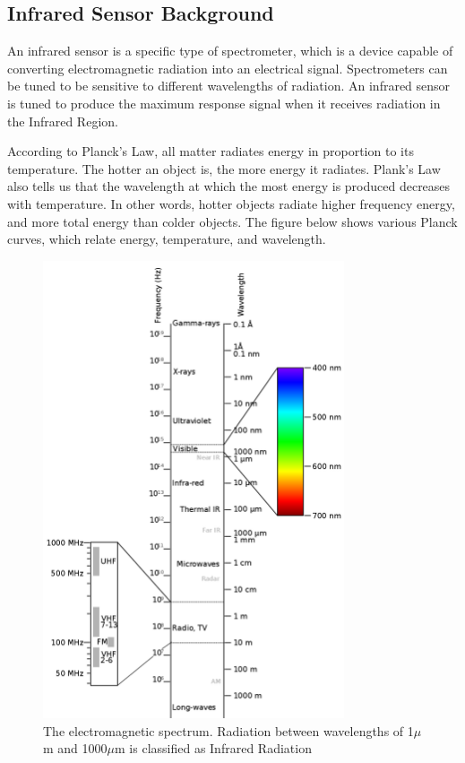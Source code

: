 \documentclass[12pt,journal,compsoc]{IEEEtran}
\begin{document}
\subsection{Infrared Sensor Background}
An infrared sensor is a specific type of spectrometer, which is a device capable of converting electromagnetic radiation into an electrical signal. Spectrometers can be tuned to be sensitive to different wavelengths of radiation. An infrared sensor is tuned to produce the maximum response signal when it receives radiation in the Infrared Region. 

According to Planck's Law, all matter radiates energy in proportion to its temperature. The hotter an object is, the more energy it radiates. Plank's Law also tells us that the wavelength at which the most energy is produced decreases with temperature. In other words, hotter objects radiate higher frequency energy, and more total energy than colder objects. The figure below shows various Planck curves, which relate energy, temperature, and wavelength.

\begin{figure}[h]
\centering
\includegraphics[width=3.5in]{em_spectrum.png}
\caption{The electromagnetic spectrum. Radiation between wavelengths of 1$\mu$m and 1000$\mu$m is classified as Infrared Radiation}
\label{em_spectrum_image}
\end{figure}
\end{document}
